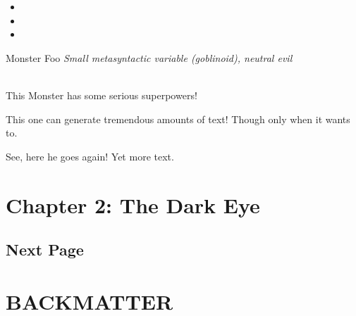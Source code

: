 \documentclass[10pt,%
	a4paper,%
	twoside,%
	twocolumn,%
	openany%
	]{book}
\begin{document}
\begin{paperbox}
	\lipsum[1]
\end{paperbox}

\onecolumn
\begin{twocolumpaperbox}
	\begin{itemize}
		\item \lipsum[1]
		\item \lipsum[1]
		\item \lipsum[1]
	\end{itemize}
\end{twocolumpaperbox}
\twocolumn

\begin{monsterbox}{Monster Foo}
	\textit{Small metasyntactic variable (goblinoid), neutral evil}\\
	\hline
	\basics[%
	armorclass = 12,
	hitpoints  = 16 (3d8 + 3),
	speed      = 50 ft
	]
	\hline
	\stats[
    STR = \stat{12}, %
    DEX = \stat{7}
	]
	\hline
	\details[%
	languages = {Common Lisp, Erlang},
	]
	\hline \\[1mm]
	\begin{monsteraction}
		This Monster has some serious superpowers!
	\end{monsteraction}
	\begin{monsteraction}
		This one can generate tremendous amounts of text! Though only when it wants to.
	\end{monsteraction}

	\begin{monsteraction}
    See, here he goes again! Yet more text.
	\end{monsteraction}
\end{monsterbox}

\chapter{Chapter 2: The Dark Eye}

\section{Next Page}
\lipsum[1] %

\pagebreak

\lipsum[1] %

\pagebreak

\lipsum[1] %

\pagebreak

\lipsum[1] %

\pagebreak

\lipsum[1] %

\pagebreak

\lipsum[1] %

\backmatter

\chapter{BACKMATTER}

\lipsum[1] %

\lastpagebackgroundimg

\end{document}

